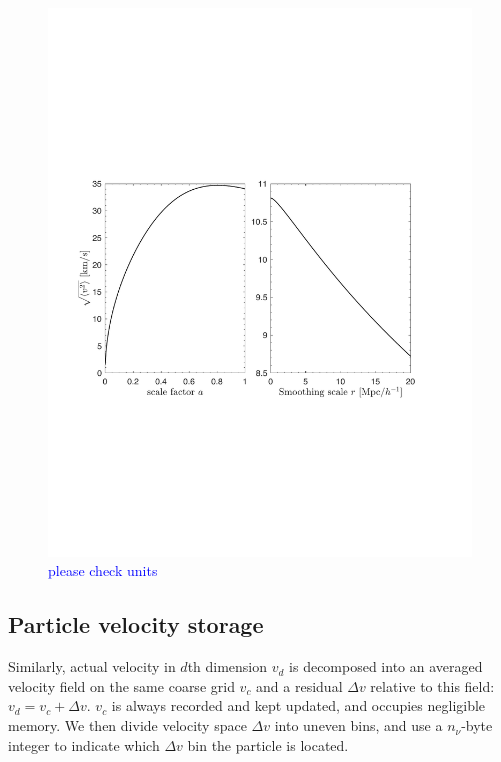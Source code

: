 \documentclass[10pt,twocolumn,preprint]{emulateapj}
\newcommand{\tcb}{\textcolor{blue}}
\begin{document}
\begin{figure}
\centering
  \includegraphics[width=1.0\linewidth]{vdisp.pdf}
 \caption{\tcb{please check units}}
\label{fig.vdisp}
\end{figure}

\subsection{Particle velocity storage}\label{ss.velocity}
Similarly, actual velocity in $d$th dimension $v_d$ is decomposed into an 
averaged velocity field on the same coarse grid $v_c$ and a residual $\Delta v$ 
relative to this field: $v_d=v_c+\Delta v$. $v_c$ is always recorded and 
kept updated, and occupies negligible memory. We then divide velocity space 
$\Delta v$ into uneven bins, and use a $n_\nu$-byte integer to indicate
which $\Delta v$ bin the particle is located.
\end{document}
